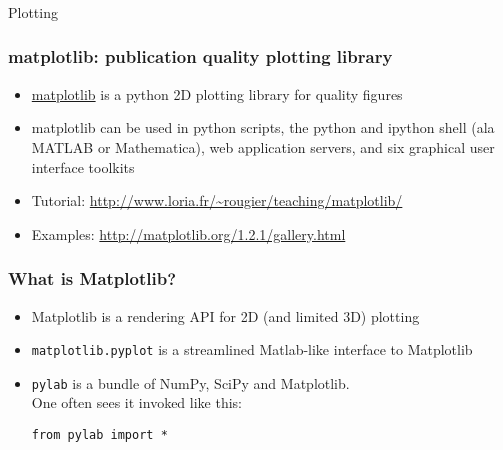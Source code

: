 \begin{frame}[fragile]\frametitle{}
\begin{center}
{\Large Plotting}
\end{center}
\end{frame}

\begin{frame}[fragile]\frametitle{matplotlib: publication quality plotting library}

\begin{itemize}
\item   \href{http://matplotlib.org/}{matplotlib} is a python 2D plotting
  library for quality figures
\item matplotlib can be used in python scripts, the python and
  ipython shell (ala MATLAB or Mathematica), web application
  servers, and six graphical user interface toolkits
    \item Tutorial: {\footnotesize\url{http://www.loria.fr/~rougier/teaching/matplotlib/}}
  \item Examples: {\footnotesize\url{http://matplotlib.org/1.2.1/gallery.html}}
\end{itemize}

\end{frame}

\begin{frame}[fragile]\frametitle{What is Matplotlib?}
    
    \begin{itemize}
        \item Matplotlib is a rendering API for 2D (and limited 3D) plotting
        \item \lstinline|matplotlib.pyplot| is a streamlined Matlab-like interface to Matplotlib
        \item \lstinline|pylab| is a bundle of NumPy, SciPy and Matplotlib.\\
        One often sees it invoked like this:
        \begin{lstlisting}
from pylab import *
        \end{lstlisting}
    \end{itemize}
\end{frame}

